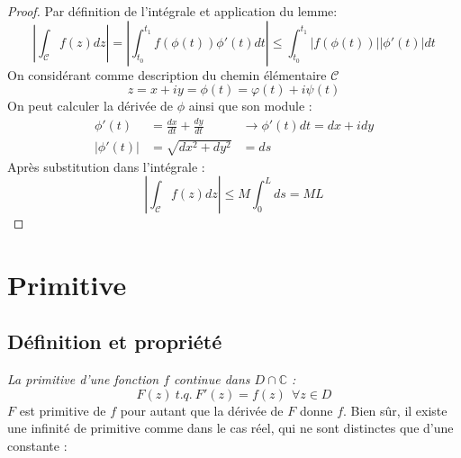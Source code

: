     \begin{proof}
    Par définition de l'intégrale et application du lemme:
    \begin{equation}
    \left|\int_\mathcal{C} f(z) dz\right| = \left|\int_{t_0}^{t_1} f(\phi(t))\phi'(t)
    dt\right| \leq \int_{t_0}^{t_1} |f(\phi(t))||\phi'(t)| dt
    \end{equation}
    On considérant comme description du chemin élémentaire $\mathcal{C}$ 
    \begin{equation}
    z = x+iy = \phi(t) = \varphi(t) + i\psi(t)
    \end{equation}
    On peut calculer la dérivée de $\phi$ ainsi que son module : 
    \begin{equation}
    \begin{array}{lll}
    \phi'(t) &= \frac{dx}{dt} + \frac{dy}{dt} &\rightarrow \phi'(t)dt= dx + idy\\
    |\phi'(t)| &= \sqrt{dx^2 + dy^2}  &= ds
    \end{array}
    \end{equation}
    Après substitution dans l'intégrale :
    \begin{equation}
     \left|\int_\mathcal{C} f(z) dz\right| \leq M\int_0^L ds = ML
    \end{equation}
    \end{proof}
    
    
    
    
    
    
\section{Primitive}
    \subsection{Définition et propriété}
    \textit{La primitive d'une fonction $f$ continue dans $D \cap \mathbb{C}$ :}
    \begin{equation}
    F(z)\ t.q.\ F'(z) = f(z)\ \ \forall z \in D
    \end{equation}
    $F$ est primitive de $f$ pour autant que la dérivée de $F$ donne $f$. Bien sûr,
    il existe une infinité de primitive comme dans le cas réel, qui ne sont distinctes
    que d'une constante :\\
    
